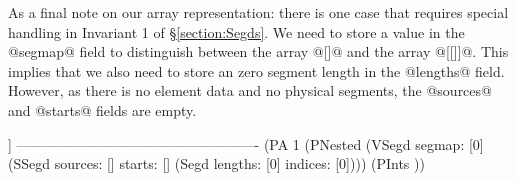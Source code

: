 As a final note on our array representation: there is one case that requires special handling in Invariant 1 of \S\ref{section:Segds}. We need to store a value in the @segmap@ field to distinguish between the array @[]@ and the array @[[]]@. This implies that we also need to store an zero segment length in the @lengths@ field. However, as there is no element data and no physical segments, the @sources@ and @starts@ fields are empty.
\par
\begin{small}
\begin{code}
                        [ [] ]
  ----------------------------------------------------
   (PA 1 (PNested
    (VSegd  segmap: [0]
    (SSegd sources: []  starts:  []
    (Segd  lengths: [0] indices: [0])))
    (PInts {}))
\end{code}
\end{small}
\par
